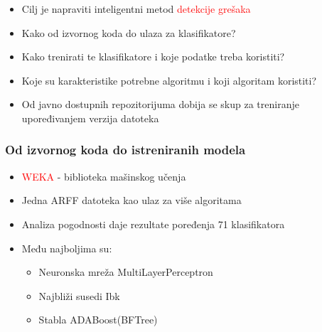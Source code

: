 \documentclass[11pt]{beamer}
\theoremstyle{definition}
\begin{document}
{\begin{frame}
\begin{itemize}
\item Cilj je napraviti inteligentni metod \textcolor{red}{detekcije grešaka}
\item Kako od izvornog koda do ulaza za klasifikatore?
\item Kako trenirati te klasifikatore i koje podatke treba koristiti?
\item Koje su karakteristike potrebne algoritmu i koji algoritam koristiti?

\item Od javno dostupnih repozitorijuma dobija se skup za treniranje upoređivanjem verzija datoteka

\end{itemize}
\end{frame}

{
\begin{frame}
\end{frame}
}

\begin{frame}
\frametitle{Od izvornog koda do istreniranih modela}
\begin{itemize}


\item \textcolor{red}{WEKA} - biblioteka mašinskog učenja
\item Jedna ARFF datoteka kao ulaz za više algoritama

\item Analiza pogodnosti daje rezultate poređenja 71 klasifikatora

\item Među najboljima su:
\begin{itemize}
	\item Neuronska mreža MultiLayerPerceptron
	\item Najbliži susedi Ibk
	\item Stabla ADABoost(BFTree)
\end{itemize}
\end{itemize}
\end{frame}



}
\end{document}
